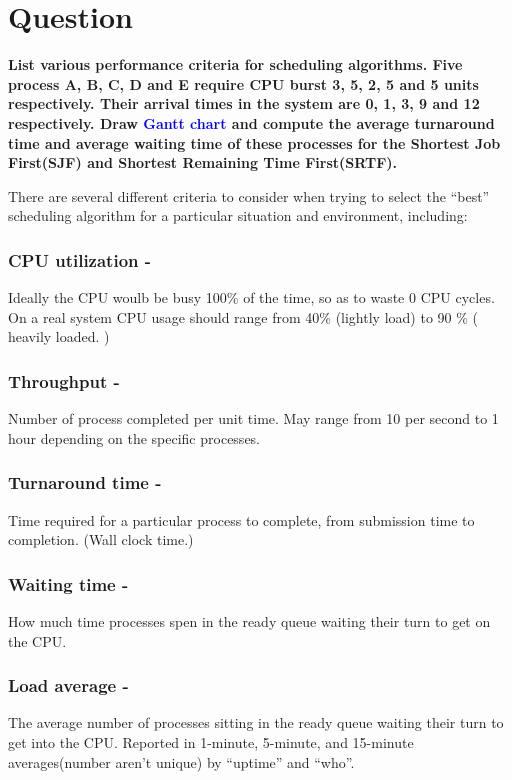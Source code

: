 \documentclass[11pt,a4paper,oneside]{article}
\begin{document}
\clearpage

\section{Question}

\bgroup \bfseries
\noindent List various performance criteria for scheduling algorithms. Five process A, B, C, D and E require CPU burst 3, 5, 2, 5 and 5 units respectively. Their arrival times in the system are 0, 1, 3, 9 and 12 respectively. Draw \textcolor{blue}{Gantt chart} and compute the average turnaround time and average waiting time of these processes for the Shortest Job First(SJF) and Shortest Remaining Time First(SRTF).
\egroup{}

\vskip 1cm

There are several different criteria to consider when trying to select the ``best'' scheduling algorithm for a particular situation and environment, including:

\subsubsection{CPU utilization - }
Ideally the CPU woulb be busy 100\% of the time, so as to waste 0 CPU cycles. On a real system CPU usage should range from 40\% (lightly load) to 90 \% ( heavily loaded. )

\subsubsection{Throughput - }
Number of process completed per unit time. May range from 10 per second to 1 hour depending on the specific processes.

\subsubsection{Turnaround time - }
Time required for a particular process to complete, from submission time to completion. (Wall clock time.)

\subsubsection{Waiting time - }
How much time processes spen in the ready queue waiting their turn to get on the CPU.

\subsubsection{Load average - }
The average number of processes sitting in the ready queue waiting their turn to get into the CPU. Reported in 1-minute, 5-minute, and 15-minute averages(number aren't unique) by ``uptime'' and ``who''.
\end{document}
